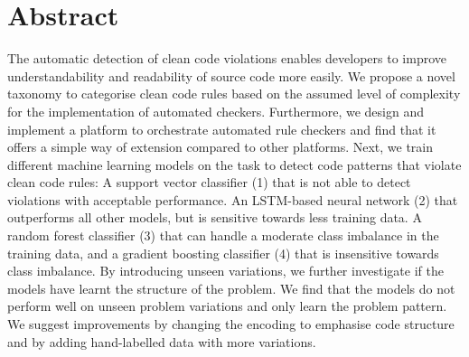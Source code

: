 \section*{Abstract}    
The automatic detection of clean code violations enables developers to improve understandability and readability of source code more easily. We propose a novel taxonomy to categorise clean code rules based on the assumed level of complexity for the implementation of automated checkers. Furthermore, we design and implement a platform to orchestrate automated rule checkers and find that it offers a simple way of extension compared to other platforms. Next, we train different machine learning models on the task to detect code patterns that violate clean code rules: A support vector classifier (1) that is not able to detect violations with acceptable performance. An LSTM-based neural network (2) that outperforms all other models, but is sensitive towards less training data. A random forest classifier (3) that can handle a moderate class imbalance in the training data, and a gradient boosting classifier (4) that is insensitive towards class imbalance. By introducing unseen variations, we further investigate if the models have learnt the structure of the problem. We find that the models do not perform well on unseen problem variations and only learn the problem pattern. We suggest improvements by changing the encoding to emphasise code structure and by adding hand-labelled data with more variations.